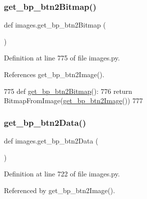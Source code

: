 \subsubsection{\texorpdfstring{get\+\_\+bp\+\_\+btn2\+Bitmap()}{get\_bp\_btn2Bitmap()}}
{\footnotesize\ttfamily def images.\+get\+\_\+bp\+\_\+btn2\+Bitmap (\begin{DoxyParamCaption}{ }\end{DoxyParamCaption})}



Definition at line 775 of file images.\+py.



References get\+\_\+bp\+\_\+btn2\+Image().


\begin{DoxyCode}
775 \textcolor{keyword}{def }\hyperlink{namespaceimages_a8b7d328c57d8752b5d6a5a65a60da1f4}{get\_bp\_btn2Bitmap}():
776     \textcolor{keywordflow}{return} BitmapFromImage(\hyperlink{namespaceimages_ada672f222565a1316fb9e187f9647f6a}{get\_bp\_btn2Image}())
777 
\end{DoxyCode}
\mbox{\label{namespaceimages_a2ce23ab5c8c0b632222e3dc118dbd0af}} 
\subsubsection{\texorpdfstring{get\+\_\+bp\+\_\+btn2\+Data()}{get\_bp\_btn2Data()}}
{\footnotesize\ttfamily def images.\+get\+\_\+bp\+\_\+btn2\+Data (\begin{DoxyParamCaption}{ }\end{DoxyParamCaption})}



Definition at line 722 of file images.\+py.



Referenced by get\+\_\+bp\+\_\+btn2\+Image().


